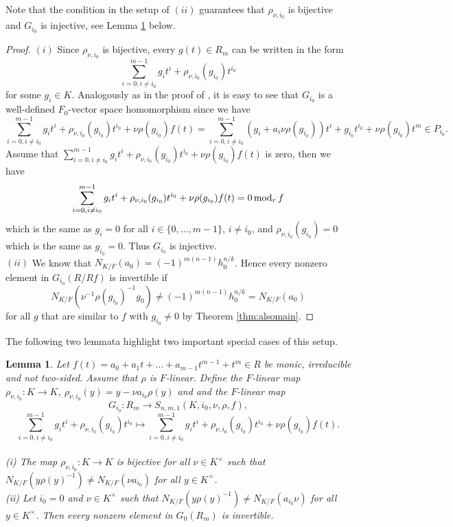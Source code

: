 \documentclass[12pt]{amsart}
\theoremstyle{plain}
\newtheorem{lemma}[theorem]{Lemma}
\theoremstyle{definition}
\numberwithin{equation}{section}
\numberwithin{figure}{section}
\begin{document}
Note that the condition in the setup of  $(ii)$ guarantees that $\rho_{\nu,i_0}$ is  bijective and $G_{i_0}$ is injective, see Lemma \ref{le:important} below.

\begin{proof}
$(i)$
 Since $\rho_{\nu,i_0}$ is bijective, every $g(t)\in R_m$ can be written in the form
$$\sum_{i=0,i\not=i_0}^{m-1} g_it^i +\rho_{\nu,i_0}(g_{i_0})t^{i_0}$$
for some $g_i\in K$.
 Analogously as in the proof of \cite[Lemma 5.3]{NewS}, it is easy to see that $G_{i_0}$ is a well-defined $F_0$-vector space homomorphism since we have
$$\sum_{i=0,i\not=i_0}^{m-1} g_it^i +\rho_{\nu,i_0}(g_{i_0})t^{i_0}+\nu\rho(g_{i_0})f(t)=
\sum_{i=0,i\not=i_0}^{m-1} (g_i +a_i \nu \rho(g_{i_0})  )t^i +   g_{i_0}t^{i_0}+ \nu\rho(g_{i_0})t^m \in P_{i_0}.$$
 Assume that
$\sum_{i=0,i\not=i_0}^{m-1} g_it^i +\rho_{\nu,i_0}(g_{i_0})t^{i_0}+\nu\rho(g_{i_0})f(t)$ is  zero, then we have
$$\sum_{i=0,i\not=i_0}^{m-1} g_it^i +\rho_{\nu,i_0}(g_{i_0})t^{i_0}+\nu\rho(g_{i_0})f(t)=0\, {\rm mod}_r \, f$$
which is the same as $g_i=0$ for all $i\in \{0,\dots, m-1 \}$, $i\not=i_0$, and $\rho_{\nu,i_0}(g_{i_0})=0$ which is the same as $g_{i_0}=0$.
Thus $G_{i_0}$ is injective.
\\ $(ii)$  We know that
$N_{K/F}(a_0)=(-1)^{m(n-1)}h_0^{n/k}$. Hence every nonzero element in $G_{i_0}(R/Rf)$ is invertible if
 $$N_{K/F}( \nu^{-1}\rho(g_{i_0})^{-1}  g_0 )\not=(-1)^{m(n-1)}h_0^{n/k}= N_{K/F}(a_0 )$$
for all $g$ that are similar to $f$ with $g_{i_0}\not=0$ by Theorem \ref{thm:alsomain}.
\end{proof}

The following two lemmata highlight two important special cases of this setup.



\begin{lemma}\label{le:important}
Let $f(t)=a_0+a_1t+\dots+ a_{m-1} t^{m-1}+t^m \in R$ be monic, irreducible and not two-sided.
Assume that $\rho$ is $F$-linear. Define the $F$-linear map $\rho_{\nu,i_0}: K\to K$, $\rho_{\nu,i_0}(y)=y-\nu a_{i_0}\rho(y)$ and
and the $F$-linear map
$$G_{i_0}:R_m\to S_{n,m,1}(K,i_0,\nu,\rho, f),$$
$$\sum_{i=0,i\not=i_0}^{m-1} g_it^i +\rho_{\nu,i_0}(g_{i_0})t^{i_0}\mapsto
\sum_{i=0,i\not=i_0}^{m-1} g_it^i +\rho_{\nu,i_0}(g_{i_0})t^{i_0}+\nu\rho(g_{i_0})f(t).$$
\\ (i) The map $\rho_{\nu,i_0}: K\to K$ is  bijective for all $\nu\in K^\times$ such that
$N_{K/F}(y \rho(y)^{-1})\not =N_{K/F}(\nu a_{i_0}) $ for all $y\in K^\times$.
\\ (ii)
 Let $i_0=0$ and $\nu\in K^\times$  such that $N_{K/F}(y \rho(y)^{-1})\not =N_{K/F}(a_{i_0} \nu ) $ for all $y\in K^\times$.  Then every nonzero element in $G_{0}(R_m)$ is invertible.
 \end{lemma}
\end{document}
